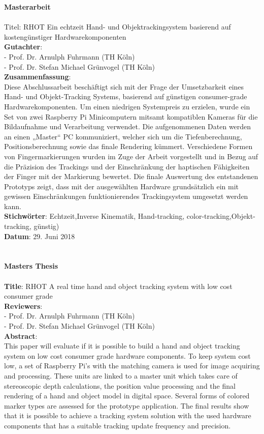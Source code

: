 \begin{titlepage}
\begin{figure}[!ht]
\begin{flushright}
\end{flushright}
\end{figure}
\newpage
\setcounter{page}{1}
\LARGE\textbf{Masterarbeit}\\\\
\small
Titel: RHOT Ein echtzeit Hand- und Objektrackingsystem basierend auf kostengünstiger Hardwarekomponenten\\
\textbf{Gutachter}:\\
	- Prof. Dr. Arnulph Fuhrmann (TH Köln)\\
	- Prof. Dr. Stefan Michael Grünvogel (TH Köln)\\
\textbf{Zusammenfassung}:\\ 
Diese Abschlussarbeit beschäftigt sich mit der Frage der Umsetzbarkeit eines Hand- und Objekt-Tracking Systems, basierend auf günstigen consumer-grade Hardwarekomponenten. Um einen niedrigen Systempreis zu erzielen, wurde ein Set von zwei Raspberry Pi Minicomputern mitsamt kompatiblen Kameras für die Bildaufnahme und Verarbeitung verwendet. Die aufgenommenen Daten werden an einen „Master“ PC kommuniziert, welcher sich um die Tiefenberechnung, Positionsberechnung sowie das finale Rendering kümmert. Verschiedene Formen von Fingermarkierungen wurden im Zuge der Arbeit vorgestellt und in Bezug auf die Präzision des Trackings und der Einschränkung der haptischen Fähigkeiten der Finger mit der Markierung bewertet. Die finale Auswertung des entstandenen Prototyps zeigt, dass mit der ausgewählten Hardware grundsätzlich ein mit gewissen Einschränkungen funktionierendes Trackingsystem umgesetzt werden kann.\\
\textbf{Stichwörter}: Echtzeit,Inverse Kinematik, Hand-tracking, color-tracking,Objekt-tracking, günstig)\\
\textbf{Datum}: 29. Juni 2018\\\\\\
\LARGE \textbf{Masters Thesis}\\\\
\small
\textbf{Title}: RHOT A real time hand and object tracking system with low cost consumer grade\\
\textbf{Reviewers}:\\
	- Prof. Dr. Arnulph Fuhrmann (TH Köln)\\
	- Prof. Dr. Stefan Michael Grünvogel (TH Köln)\\
\textbf{Abstract}: \\This paper will evaluate if it is possible to build a hand and object tracking system on low cost consumer grade hardware components. To keep system cost low, a set of Raspberry Pi's with the matching camera is used for image acquiring and processing. These units are linked to a master unit which takes care of stereoscopic depth calculations, the position value processing and the final rendering of a hand and object model in digital space. Several forms of colored marker types are assessed for the prototype application. The final results show that it is possible to achieve a tracking system solution with the used hardware components that has a suitable tracking update frequency and precision.\\

\end{titlepage}
